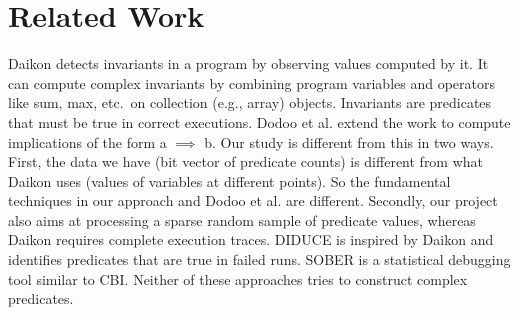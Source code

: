 
\section{Related Work}
\label{sec-rw}
Daikon \cite{ErnstPGMPTX2006} detects invariants in a program by observing values computed by it.  It can compute complex invariants by combining program variables and operators like sum, max, etc.\ on collection (e.g., array) objects.  Invariants are predicates that must be true in correct executions.  Dodoo et al. \cite{ErnstDRAFT} extend the work to compute implications of the form a $\implies$ b.  Our study is different from this in two ways.  First, the data we have (bit vector of predicate counts) is different from what Daikon uses (values of variables at different points).  So the fundamental techniques in our approach and Dodoo et al. \cite{ErnstDRAFT} are different.  Secondly, our project also aims at processing a sparse random sample of predicate values, whereas Daikon requires complete execution traces.  DIDUCE \cite{581377} is inspired by Daikon and identifies predicates that are true in failed runs.  SOBER \cite{1081753} is a statistical debugging tool similar to CBI\@.  Neither of these approaches tries to construct complex predicates.
